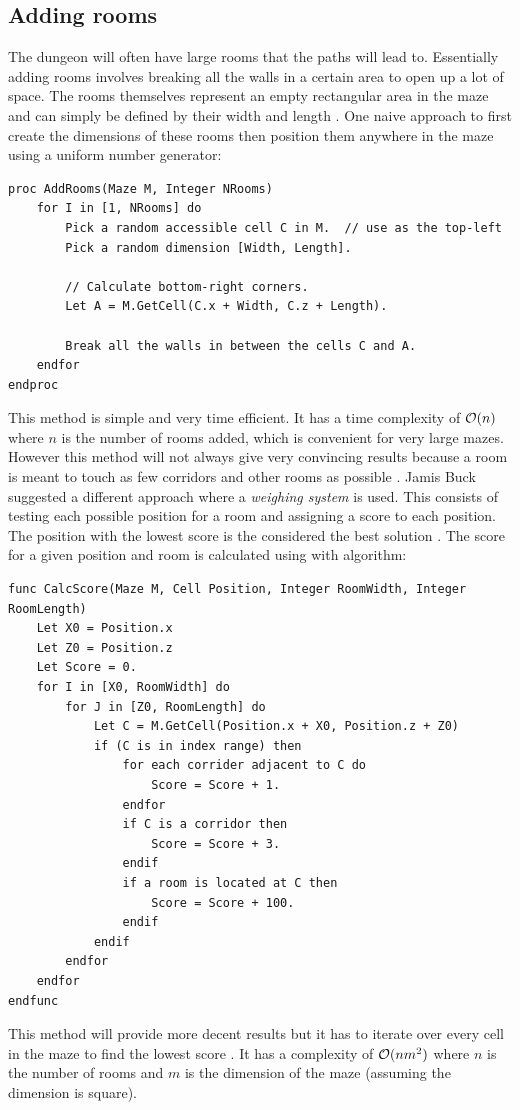 \subsection{Adding rooms}
The dungeon will often have large rooms that the paths will lead to. Essentially adding rooms involves breaking all the walls in a certain area to open up a lot of space. The rooms themselves represent an empty rectangular area in the maze and can simply be defined by their width and length \citep{JBuck}. One naive approach to first create the dimensions of these rooms then position them anywhere in the maze using a uniform number generator:
\lstAlgo
\begin{lstlisting}
proc AddRooms(Maze M, Integer NRooms)
	for I in [1, NRooms] do
		Pick a random accessible cell C in M.  // use as the top-left
		Pick a random dimension [Width, Length].
		
		// Calculate bottom-right corners.
		Let A = M.GetCell(C.x + Width, C.z + Length).
		
		Break all the walls in between the cells C and A.
	endfor
endproc
\end{lstlisting}

This method is simple and very time efficient. It has a time complexity of $\mathcal{O} (n)$ where $n$ is the number of rooms added, which is convenient for very large mazes. However this method will not always give very convincing results because a room is meant to touch as few corridors and other rooms as possible \citep{JBuck}. Jamis Buck suggested a different approach where a {\em weighing system} is used. This consists of testing each possible position for a room and assigning a score to each position. The position with the lowest score is the considered the best solution \citep{JBuck}. The score for a given position and room is calculated using with algorithm:
\lstAlgo
\begin{lstlisting}
func CalcScore(Maze M, Cell Position, Integer RoomWidth, Integer RoomLength)
	Let X0 = Position.x
	Let Z0 = Position.z
	Let Score = 0.
	for I in [X0, RoomWidth] do
		for J in [Z0, RoomLength] do
			Let C = M.GetCell(Position.x + X0, Position.z + Z0)
			if (C is in index range) then
				for each corrider adjacent to C do
					Score = Score + 1.
				endfor
				if C is a corridor then
					Score = Score + 3.
				endif
				if a room is located at C then
					Score = Score + 100.
				endif
			endif
		endfor
	endfor
endfunc
\end{lstlisting}
This method will provide more decent results but it has to iterate over every cell in the maze to find the lowest score \citep{JBuck}. It has a complexity of $\mathcal{O} (nm^2)$ where $n$ is the number of rooms and $m$ is the dimension of the maze (assuming the dimension is square).

